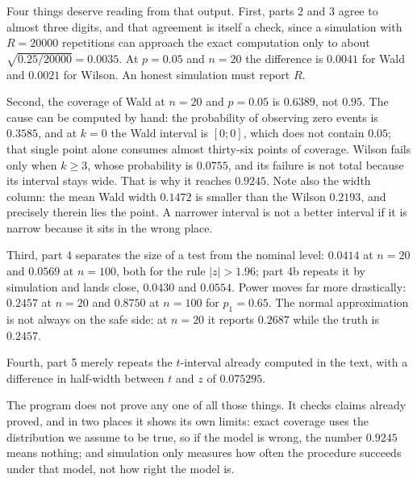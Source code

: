 Four things deserve reading from that output. First, parts 2 and 3 agree to almost
three digits, and that agreement is itself a check, since a simulation with
$R=20000$ repetitions can approach the exact computation only to about
$\sqrt{0.25/20000}=0.0035$. At $p=0.05$ and $n=20$ the difference is $0.0041$ for
Wald and $0.0021$ for Wilson. An honest simulation must report $R$.

Second, the coverage of Wald at $n=20$ and $p=0.05$ is $0.6389$, not $0.95$.
The cause can be computed by hand: the probability of observing zero events is $0.3585$,
and at $k=0$ the Wald interval is $[0;0]$, which does not contain $0.05$; that single point
alone consumes almost thirty-six points of coverage. Wilson fails only when
$k\ge3$, whose probability is $0.0755$, and its failure is not total because its interval
stays wide. That is why it reaches $0.9245$. Note also the width column: the mean
Wald width $0.1472$ is smaller than the Wilson $0.2193$, and precisely therein lies the
point. A narrower interval is not a better interval if it is narrow because it sits in the
wrong place.

Third, part 4 separates the size of a test from the nominal level: $0.0414$ at $n=20$ and
$0.0569$ at $n=100$, both for the rule $|z|>1.96$; part 4b repeats it
by simulation and lands close, $0.0430$ and $0.0554$. Power moves far more
drastically: $0.2457$ at $n=20$ and $0.8750$ at $n=100$ for $p_1=0.65$.
The normal approximation is not always on the safe side: at $n=20$ it reports $0.2687$
while the truth is $0.2457$.

Fourth, part 5 merely repeats the $t$-interval already computed in the text, with a
difference in half-width between $t$ and $z$ of $0.075295$.

The program does not prove any one of all those things. It checks claims already
proved, and in two places it shows its own limits: exact coverage
uses the distribution we assume to be true, so if the model is wrong, the number
$0.9245$ means nothing; and simulation only measures how often
the procedure succeeds under that model, not how right the model is.

